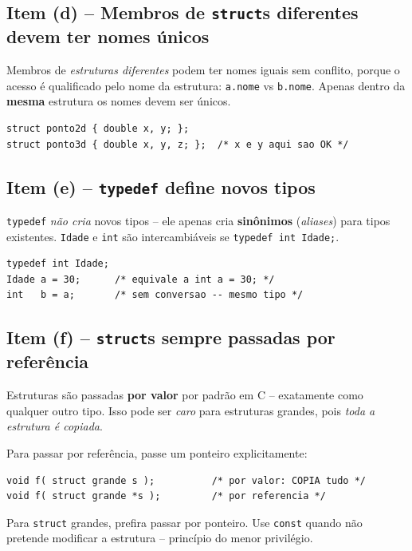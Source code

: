 \documentclass[12pt,a4paper]{article}
\begin{document}
\subsection*{Item (d) -- Membros de \texttt{struct}s diferentes devem ter nomes únicos}
\begin{tcolorbox}[colback=red!5,colframe=deitelred,title={\bfseries FALSO}]
Membros de \textit{estruturas diferentes} podem ter nomes iguais sem conflito,
porque o acesso é qualificado pelo nome da estrutura: \texttt{a.nome} vs
\texttt{b.nome}. Apenas dentro da \textbf{mesma} estrutura os nomes devem ser
únicos.

\begin{lstlisting}
struct ponto2d { double x, y; };
struct ponto3d { double x, y, z; };  /* x e y aqui sao OK */
\end{lstlisting}
\end{tcolorbox}

\subsection*{Item (e) -- \texttt{typedef} define novos tipos}
\begin{tcolorbox}[colback=red!5,colframe=deitelred,title={\bfseries FALSO}]
\texttt{typedef} \textit{não cria} novos tipos -- ele apenas cria \textbf{sinônimos}
(\textit{aliases}) para tipos existentes. \texttt{Idade} e \texttt{int} são
intercambiáveis se \texttt{typedef int Idade;}.

\begin{lstlisting}
typedef int Idade;
Idade a = 30;      /* equivale a int a = 30; */
int   b = a;       /* sem conversao -- mesmo tipo */
\end{lstlisting}
\end{tcolorbox}

\subsection*{Item (f) -- \texttt{struct}s sempre passadas por referência}
\begin{tcolorbox}[colback=red!5,colframe=deitelred,title={\bfseries FALSO}]
Estruturas são passadas \textbf{por valor} por padrão em C -- exatamente como
qualquer outro tipo. Isso pode ser \textit{caro} para estruturas grandes, pois
\textit{toda a estrutura é copiada}.

Para passar por referência, passe um ponteiro explicitamente:
\begin{lstlisting}
void f( struct grande s );          /* por valor: COPIA tudo */
void f( struct grande *s );         /* por referencia */
\end{lstlisting}

\begin{boaprática}
  Para \texttt{struct} grandes, prefira passar por ponteiro. Use \texttt{const}
  quando não pretende modificar a estrutura -- princípio do menor privilégio.
\end{boaprática}
\end{tcolorbox}
\end{document}
